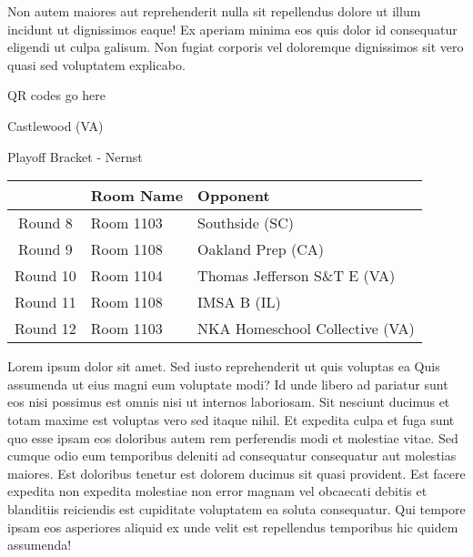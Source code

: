 \documentclass{article}%
\begin{document}
\newline%
Non autem maiores aut reprehenderit nulla sit repellendus dolore ut illum incidunt ut dignissimos eaque! Ex aperiam minima eos quis dolor id consequatur eligendi ut culpa galisum. Non fugiat corporis vel doloremque dignissimos sit vero quasi sed voluptatem explicabo.\newline%
\newline%
%
\vspace*{30pt}%
\begin{center}%
\begin{Huge}%
QR codes go here%
\end{Huge}%
\end{center}%
\newpage%
\begin{center}%
\begin{Huge}%
Castlewood (VA)%
\end{Huge}%
\vspace*{8pt}%
\linebreak%
\begin{Large}%
Playoff Bracket {-} Nernst%
\end{Large}%
\end{center}%
\begin{tabularx}{\textwidth}{|c|Y|Y|}%
\hline%
&Room Name&Opponent\\%
\hline%
Round 8&Room 1103&Southside (SC)\\%
Round 9&Room 1108&Oakland Prep (CA)\\%
Round 10&Room 1104&Thomas Jefferson S\&T E (VA)\\%
Round 11&Room 1108&IMSA B (IL)\\%
Round 12&Room 1103&NKA Homeschool Collective (VA)\\%
\hline%
\end{tabularx}%
\vspace*{8pt}%
\linebreak%
\newline%
\newline%
Lorem ipsum dolor sit amet. Sed iusto reprehenderit ut quis voluptas ea Quis assumenda ut eius magni eum voluptate modi? Id unde libero ad pariatur sunt eos nisi possimus est omnis nisi ut internos laboriosam. Sit nesciunt ducimus et totam maxime est voluptas vero sed itaque nihil. Et expedita culpa et fuga sunt quo esse ipsam eos doloribus autem rem perferendis modi et molestiae vitae.\newline%
\newline%
Sed cumque odio eum temporibus deleniti ad consequatur consequatur aut molestias maiores. Est doloribus tenetur est dolorem ducimus sit quasi provident. Est facere expedita non expedita molestiae non error magnam vel obcaecati debitis et blanditiis reiciendis est cupiditate voluptatem ea soluta consequatur. Qui tempore ipsam eos asperiores aliquid ex unde velit est repellendus temporibus hic quidem assumenda!\newline%
\end{document}
